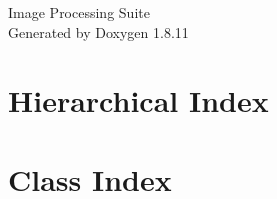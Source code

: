 \documentclass[twoside]{book}
\newcommand{\+}{\discretionary{\mbox{\scriptsize$\hookleftarrow$}}{}{}}
\newcommand{\clearemptydoublepage}{%
  \newpage{\pagestyle{empty}\cleardoublepage}%
}
\begin{document}
\hypersetup{pageanchor=false,
             bookmarksnumbered=true,
             pdfencoding=unicode
            }
\begin{titlepage}
\vspace*{7cm}
\begin{center}%
{\Large Image Processing Suite }\\
\vspace*{1cm}
{\large Generated by Doxygen 1.8.11}\\
\end{center}
\end{titlepage}
\clearemptydoublepage
\tableofcontents
\clearemptydoublepage
{}
\hypersetup{pageanchor=true}

\chapter{Hierarchical Index}

\chapter{Class Index}

\end{document}
